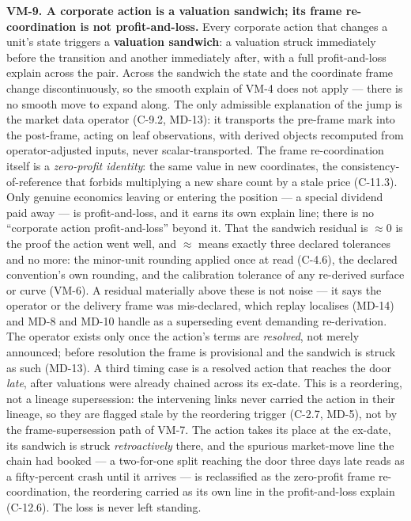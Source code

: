 \documentclass[11pt,a4paper]{article}
\newcommand{\vlabel}[1]{\leavevmode\hypertarget{vm-#1}{}%
  \marginpar{\raggedright\scriptsize\ttfamily\textcolor{gray}{#1}}}
\newcommand{\trace}[1]{\par\smallskip{\small\itshape (#1)}}
\begin{document}
\vlabel{VM-9}\textbf{VM-9. A corporate action is a valuation sandwich; its
frame re-coordination is not profit-and-loss.} Every corporate action that
changes a unit's state triggers a \textbf{valuation sandwich}: a valuation
struck immediately before the transition and another immediately after,
with a full profit-and-loss explain across the pair. Across the sandwich
the state and the coordinate frame change discontinuously, so the smooth
explain of VM-4 does not apply --- there is no smooth move to expand along.
The only admissible explanation of the jump is the market data operator
(C-9.2, MD-13): it transports the pre-frame mark into the post-frame,
acting on leaf observations, with derived objects recomputed from
operator-adjusted inputs, never scalar-transported. The frame
re-coordination itself is a \emph{zero-profit identity}: the same value in
new coordinates, the consistency-of-reference that forbids multiplying a
new share count by a stale price (C-11.3). Only genuine economics leaving
or entering the position --- a special dividend paid away --- is
profit-and-loss, and it earns its own explain line; there is no ``corporate
action profit-and-loss'' beyond it. That the sandwich residual is
$\approx 0$ is the proof the action went well, and $\approx$ means exactly
three declared tolerances and no more: the minor-unit rounding applied once
at read (C-4.6), the declared convention's own rounding, and the
calibration tolerance of any re-derived surface or curve (VM-6). A residual
materially above these is not noise --- it says the operator or the
delivery frame was mis-declared, which replay localises (MD-14) and MD-8
and MD-10 handle as a superseding event demanding re-derivation. The
operator exists only once the action's terms are \emph{resolved}, not
merely announced; before resolution the frame is provisional and the
sandwich is struck as such (MD-13). A third timing case is a resolved
action that reaches the door \emph{late}, after valuations were already
chained across its ex-date. This is a reordering, not a lineage
supersession: the intervening links never carried the action in their
lineage, so they are flagged stale by the reordering trigger (C-2.7,
MD-5), not by the frame-supersession path of VM-7. The action takes its
place at the ex-date, its sandwich is struck \emph{retroactively} there,
and the spurious market-move line the chain had booked --- a two-for-one
split reaching the door three days late reads as a fifty-percent crash
until it arrives --- is reclassified as the zero-profit frame
re-coordination, the reordering carried as its own line in the
profit-and-loss explain (C-12.6). The loss is never left standing.
\trace{Order, Correctness, Time travel; C-9.2, C-9.3, C-11.3, MD-13, MD-5.}
\end{document}
